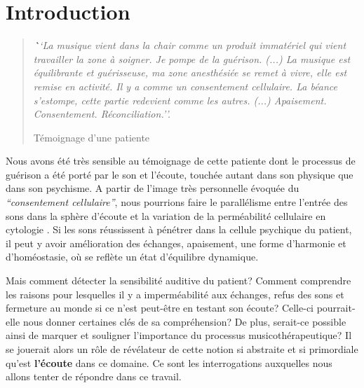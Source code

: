 

\chapter{Introduction}



\begin{quotation}
 \textit{\textbf ``La musique vient dans la chair comme un produit immatériel
 qui vient travailler la zone à soigner. Je pompe de la
 guérison.
 (...)
 La musique est équilibrante et guérisseuse, ma zone
 anesthésiée se remet à vivre, elle est remise en activité.
 Il y a comme un consentement cellulaire.
La béance s'estompe, cette
partie redevient comme les autres. (...)
Apaisement. Consentement. Réconciliation.''.}

Témoignage d'une patiente

\end{quotation}

Nous avons été très sensible au témoignage de cette patiente dont le
processus de guérison a été porté par le son et l'écoute, touchée
autant dans son physique
que dans son psychisme.
A partir de l'image très personnelle évoquée du
\textit{``consentement cellulaire''}, nous pourrions faire le
parallélisme entre l'entrée des sons dans la sphère d'écoute et la variation de la
perméabilité cellulaire en cytologie \autocite[ch. 3 pp. 70--76]{marieb:biologie}. Si les sons réussissent à pénétrer dans la
cellule psychique du patient, il peut y avoir amélioration des
échanges, apaisement, une forme d'harmonie et d'homéostasie,  \autocite[ch. 1
p. 10]{marieb:biologie} où se reflète un état d'équilibre dynamique.

Mais comment détecter la sensibilité auditive du patient?
Comment comprendre les raisons pour lesquelles il y a imperméabilité
aux
échanges, refus des sons et fermeture au monde si ce n'est
peut-être en testant
son écoute?  Celle-ci pourrait-elle nous donner certaines clés de sa
compréhension?
De plus, serait-ce possible ainsi
de marquer et souligner l'importance du processus musicothérapeutique?
Il se jouerait alors un
rôle de
révélateur de cette notion si abstraite et si primordiale qu'est
\textbf{l'écoute} dans ce domaine. Ce sont les interrogations auxquelles nous allons tenter de répondre dans ce travail.


